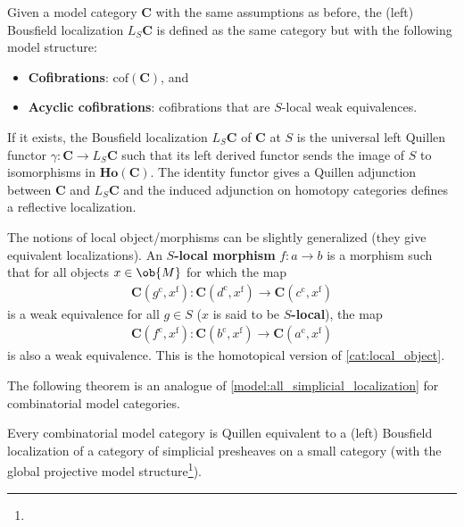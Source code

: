     \begin{construct}
        Given a model category $\mathbf{C}$ with the same assumptions as before, the (left) Bousfield localization $L_S\mathbf{C}$ is defined as the same category but with the following model structure:
        \begin{itemize}
            \item\textbf{Cofibrations}: $\mathrm{cof}(\mathbf{C})$, and
            \item\textbf{Acyclic cofibrations}: cofibrations that are $S$-local weak equivalences.
        \end{itemize}
        If it exists, the Bousfield localization $L_S\mathbf{C}$ of $\mathbf{C}$ at $S$ is the universal left Quillen functor $\gamma:\mathbf{C}\rightarrow L_S\mathbf{C}$ such that its left derived functor sends the image of $S$ to isomorphisms in $\mathbf{Ho}(\mathbf{C})$. The identity functor gives a Quillen adjunction between $\mathbf{C}$ and $L_S\mathbf{C}$ and the induced adjunction on homotopy categories defines a reflective localization.
    \end{construct}
    \begin{remark}
        The notions of local object/morphisms can be slightly generalized (they give equivalent localizations). An \textbf{$S$-local morphism} $f:a\rightarrow b$ is a morphism such that for all objects $x\in\ob{M}$ for which the map
        \begin{gather}
            \mathbf{C}(g^{\mathrm{c}},x^{\mathrm{f}}):\mathbf{C}(d^{\mathrm{c}},x^{\mathrm{f}})\rightarrow\mathbf{C}(c^{\mathrm{c}},x^{\mathrm{f}})
        \end{gather}
        is a weak equivalence for all $g\in S$ ($x$ is said to be \textbf{$S$-local}), the map
        \begin{gather}
            \mathbf{C}(f^{\mathrm{c}},x^{\mathrm{f}}):\mathbf{C}(b^{\mathrm{c}},x^{\mathrm{f}})\rightarrow\mathbf{C}(a^{\mathrm{c}},x^{\mathrm{f}})
        \end{gather}
        is also a weak equivalence. This is the homotopical version of \cref{cat:local_object}.
    \end{remark}


    The following theorem is an analogue of \cref{model:all_simplicial_localization} for combinatorial model categories.
    \begin{theorem}[Dugger]\label{model:dugger}
        Every combinatorial model category is Quillen equivalent to a (left) Bousfield localization of a category of simplicial presheaves on a small category (with the global projective model structure\footnote{}).
    \end{theorem}

